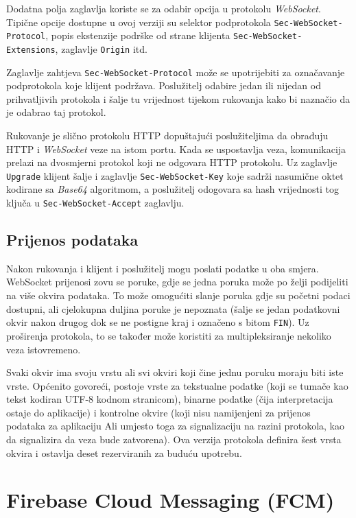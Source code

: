 \documentclass[times, utf8, zavrsni]{fer}
\begin{document}
Dodatna polja zaglavlja koriste se za odabir opcija u protokolu {\em WebSocket}. Tipične opcije dostupne u ovoj verziji su selektor podprotokola {\tt Sec-WebSocket-Protocol}, popis ekstenzije podrške od strane klijenta {\tt Sec-WebSocket-Extensions}, zaglavlje {\tt Origin} itd. 

Zaglavlje zahtjeva {\tt Sec-WebSocket-Protocol} može se upotrijebiti za označavanje podprotokola koje klijent podržava. Poslužitelj odabire jedan ili nijedan od prihvatljivih protokola i šalje tu vrijednost tijekom rukovanja kako bi naznačio da je odabrao taj protokol.

Rukovanje je slično protokolu HTTP dopuštajući poslužiteljima da obrađuju HTTP i {\em WebSocket} veze na istom portu. Kada se uspostavlja veza, komunikacija prelazi na dvosmjerni protokol koji ne odgovara HTTP protokolu. Uz zaglavlje {\tt Upgrade} klijent šalje i zaglavlje {\tt Sec-WebSocket-Key} koje sadrži nasumične oktet kodirane sa {\em Base64} algoritmom, a poslužitelj odogovara sa hash vrijednosti tog ključa u {\tt Sec-WebSocket-Accept} zaglavlju.

\subsection{Prijenos podataka}
Nakon rukovanja i klijent i poslužitelj mogu poslati podatke u oba smjera. WebSocket prijenosi zovu se poruke, gdje se jedna poruka može po želji podijeliti na više okvira podataka. To može omogućiti slanje poruka gdje su početni podaci dostupni, ali cjelokupna duljina poruke je nepoznata (šalje se jedan podatkovni okvir nakon drugog dok se ne postigne kraj i označeno s bitom {\tt FIN}). Uz proširenja protokola, to se također može koristiti za multipleksiranje nekoliko veza istovremeno. 

Svaki okvir ima svoju vrstu ali svi okviri koji čine jednu poruku moraju biti iste vrste. Općenito govoreći, postoje vrste za tekstualne podatke (koji se tumače kao tekst kodiran UTF-8 kodnom stranicom), binarne podatke (čija interpretacija ostaje do aplikacije) i kontrolne okvire (koji nisu namijenjeni za prijenos podataka za aplikaciju Ali umjesto toga za signalizaciju na razini protokola, kao da signalizira da veza bude zatvorena). Ova verzija protokola definira šest vrsta okvira i ostavlja deset rezerviranih za buduću upotrebu.

\section{Firebase Cloud Messaging (FCM)}
\end{document}
